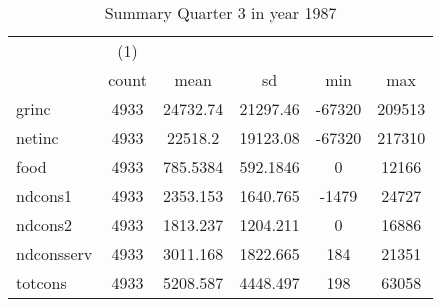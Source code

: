 \begin{table}[htbp]\centering
\def\sym#1{\ifmmode^{#1}\else\(^{#1}\)\fi}
\caption{Summary Quarter 3 in year 1987 \label{sum\_Q3\_y1987}}
\begin{tabular}{l*{1}{ccccc}}
\hline\hline
            &\multicolumn{1}{c}{(1)}&            &            &            &            \\
            &       count&        mean&          sd&         min&         max\\
\hline
grinc       &        4933&    24732.74&    21297.46&      -67320&      209513\\
netinc      &        4933&     22518.2&    19123.08&      -67320&      217310\\
food        &        4933&    785.5384&    592.1846&           0&       12166\\
ndcons1     &        4933&    2353.153&    1640.765&       -1479&       24727\\
ndcons2     &        4933&    1813.237&    1204.211&           0&       16886\\
ndconsserv  &        4933&    3011.168&    1822.665&         184&       21351\\
totcons     &        4933&    5208.587&    4448.497&         198&       63058\\
\hline\hline
\end{tabular}
\end{table}
